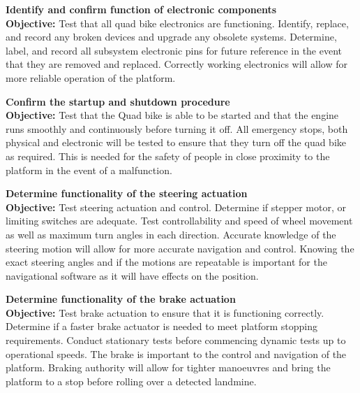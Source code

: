 \documentclass[main.tex]{subfiles}
\begin{document}
\begin{appendices}
\begin{qb}
\textbf{Identify and confirm function of electronic components}\\
\textbf{Objective:} Test that all quad bike electronics are functioning. Identify, replace, and record any broken devices and upgrade any obsolete systems. Determine, label, and record all subsystem electronic pins for future reference in the event that they are removed and replaced. Correctly working electronics will allow for more reliable operation of the platform.

\end{qb}

\begin{qb}
\textbf{Confirm the startup and shutdown procedure}\\
\textbf{Objective:} Test that the Quad bike is able to be started and that the engine runs smoothly and continuously before turning it off. All emergency stops, both physical and electronic will be tested to ensure that they turn off the quad bike as required. This is needed for the safety of people in close proximity to the platform in the event of a malfunction.  

\end{qb}

\begin{qb}
\textbf{Determine functionality of the steering actuation}\\
\textbf{Objective:} Test steering actuation and control. Determine if stepper motor, or limiting switches are adequate. Test controllability and speed of wheel movement as well as maximum turn angles in each direction. Accurate knowledge of the steering motion will allow for more accurate navigation and control. Knowing the exact steering angles and if the motions are repeatable is important for the navigational software as it will have effects on the position. 

\end{qb}

\begin{qb}
\textbf{Determine functionality of the brake actuation}\\
\textbf{Objective:} Test brake actuation to ensure that it is functioning correctly. Determine if a faster brake actuator is needed to meet platform stopping requirements. Conduct stationary tests before commencing dynamic tests up to operational speeds. The brake is important to the control and navigation of the platform. Braking authority will allow for tighter manoeuvres and bring the platform to a stop before rolling over a detected landmine. 


\end{qb}
\end{appendices}
\end{document}
